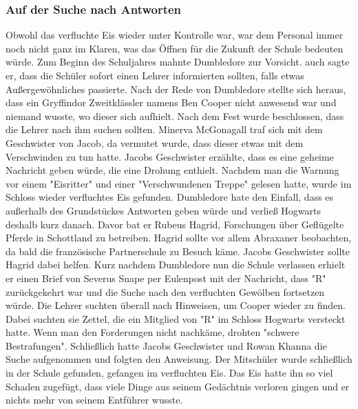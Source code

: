 \documentclass[a4paper, 10pt]{article}
\begin{document}
\subsubsection*{Auf der Suche nach Antworten}
Obwohl das verfluchte Eis wieder unter Kontrolle war, war dem Personal immer noch nicht ganz im Klaren, was das Öffnen für die Zukunft der Schule bedeuten würde. Zum Beginn des Schuljahres mahnte Dumbledore zur Vorsicht. auch sagte er, dass die Schüler sofort einen Lehrer informierten sollten, falls etwas Außergewöhnliches passierte. Nach der Rede von Dumbledore
stellte sich heraus, dass ein Gryffindor Zweitklässler namens Ben Cooper nicht anwesend war und niemand wusste, wo dieser sich aufhielt. Nach dem Fest wurde beschlossen, dass die Lehrer nach ihm suchen sollten. Minerva McGonagall traf sich mit dem Geschwister von Jacob, da vermutet wurde, dass dieser etwas mit dem Verschwinden zu tun hatte. Jacobs Geschwister erzählte, dass es eine geheime Nachricht geben würde, die eine Drohung enthielt.
\vspace{10pt}
\newline
Nachdem man die Warnung vor einem "Eisritter" und einer "Verschwundenen Treppe" gelesen hatte, wurde im Schloss wieder verfluchtes Eis gefunden. Dumbledore hate den Einfall, dass es außerhalb des Grundstückes Antworten geben würde und verließ Hogwarts deshalb kurz danach. Davor bat er Rubeus Hagrid, Forschungen über Geflügelte Pferde in Schottland zu betreiben. Hagrid sollte vor allem Abraxaner beobachten, da bald die französische Partnerschule zu Besuch käme. Jacobs Geschwister sollte Hagrid dabei helfen. Kurz nachdem Dumbledore nun die Schule verlassen erhielt er einen Brief von Severus Snape per Eulenpost mit der Nachricht, dass "R" zurückgekehrt war und die Suche nach den verfluchten Gewölben fortsetzen würde.
\vspace{10pt}
\newline
Die Lehrer suchten überall nach Hinweisen, um Cooper wieder zu finden. Dabei suchten sie Zettel, die ein Mitglied von "R" im Schloss Hogwarts versteckt hatte. Wenn man den Forderungen nicht nachkäme, drohten "schwere Bestrafungen". Schließlich hatte Jacobs Geschwister und Rowan Khanna die Suche aufgenommen und folgten den Anweisung. Der Mitschüler wurde schließlich in der Schule gefunden, gefangen im verfluchten Eis. Das Eis hatte ihn so viel Schaden zugefügt, dass viele Dinge aus seinem Gedächtnis verloren gingen und er nichts mehr von seinem Entführer wusste.
\end{document}
